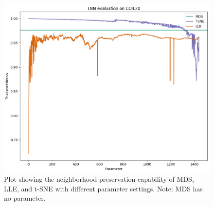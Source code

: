 \begin{figure}[!]
	\centering
	\includegraphics[width=1\columnwidth]{images/1nn_all_coil20_plot.png}
	\caption[COIL-20 Neighborhood Preservation]{Plot showing the neighborhood preservation capability of MDS, LLE, and t-SNE with different parameter settings. Note: MDS has no parameter.}
    \label{fig:1nn_all_coil20_plot}
\end{figure}

